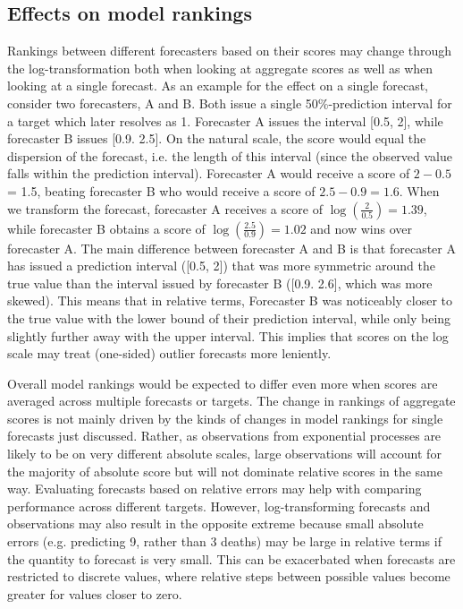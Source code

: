 \documentclass{article}
\begin{document}
\subsection{Effects on model rankings}
\label{sec:methods:rankings}
Rankings between different forecasters based on their scores may change through the log-transformation both when looking at aggregate scores as well as when looking at a single forecast. As an example for the effect on a single forecast, consider two forecasters, A and B. Both issue a single 50\%-prediction interval for a target which later resolves as 1. Forecaster A issues the interval [0.5, 2], while forecaster B issues [0.9. 2.5]. On the natural scale, the score would equal the dispersion of the forecast, i.e. the length of this interval (since the observed value falls within the prediction interval). Forecaster A would receive a score of $2 - 0.5$ = 1.5, beating forecaster B who would receive a score of $2.5 - 0.9 = 1.6$. When we transform the forecast, forecaster A receives a score of $\log (\frac{2}{0.5}) = 1.39$, while forecaster B obtains a score of $\log (\frac{2.5}{0.9}) = 1.02$ and now wins over forecaster A. The main difference between forecaster A and B is that forecaster A has issued a prediction interval ([0.5, 2]) that was more symmetric around the true value than the interval issued by forecaster B ([0.9. 2.6], which was more skewed). This means that in relative terms, Forecaster B was noticeably closer to the true value with the lower bound of their prediction interval, while only being slightly further away with the upper interval. This implies that scores on the log scale may treat (one-sided) outlier forecasts more leniently. 

Overall model rankings would be expected to differ even more when scores are averaged across multiple forecasts or targets. The change in rankings of aggregate scores is not mainly driven by the kinds of changes in model rankings for single forecasts just discussed. Rather, as observations from exponential processes are likely to be on very different absolute scales, large observations will account for the majority of absolute score but will not dominate relative scores in the same way. Evaluating forecasts based on relative errors may help with comparing performance across different targets. However, log-transforming forecasts and observations may also result in the opposite extreme because small absolute errors (e.g. predicting 9, rather than 3 deaths) may be large in relative terms if the quantity to forecast is very small. This can be exacerbated when forecasts are restricted to discrete values, where relative steps between possible values become greater for values closer to zero. 
\end{document}
